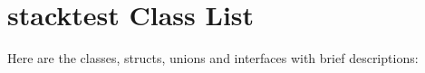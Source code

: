 \section{stacktest Class List}
Here are the classes, structs, unions and interfaces with brief descriptions:\begin{CompactList}
\item{}
\item{}
\item{}
\item{}
\item{}
\end{CompactList}
